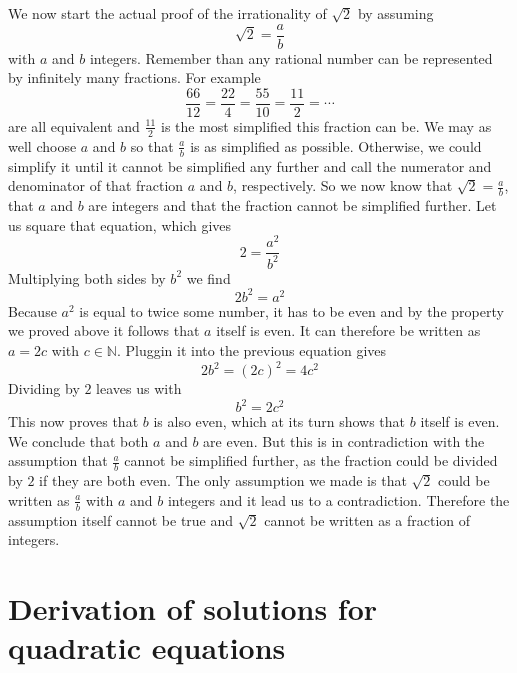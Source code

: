 \noindent We now start the actual proof of the irrationality of $\sqrt{2}$ by assuming
$$
\sqrt{2} = \frac{a}{b}
$$
with $a$ and $b$ integers. Remember than any rational number can be represented by infinitely many fractions. For example
$$
\frac{66}{12} = \frac{22}{4} = \frac{55}{10} = \frac{11}{2} = \cdots
$$
\noindent are all equivalent and $\frac{11}{2}$ is the most simplified this fraction can be. We may as well choose $a$ and $b$ so that $\frac{a}{b}$ is as simplified as possible. Otherwise, we could simplify it until it cannot be simplified any further and call the numerator and denominator of that fraction $a$ and $b$, respectively. So we now know that $\sqrt{2} = \frac{a}{b}$, that $a$ and $b$ are integers and that the fraction cannot be simplified further. Let us square that equation, which gives
$$
2 = \frac{a^2}{b^2}
$$
\noindent Multiplying both sides by $b^2$ we find
$$
2 b^2 = a^2
$$
\noindent Because $a^2$ is equal to twice some number, it has to be even and by the property we proved above it follows that $a$ itself is even. It can therefore be written as $a=2c$ with $c \in \mathbb{N}$. Pluggin it into the previous equation gives
$$
2 b^2 = \left( 2 c \right)^2 = 4 c^2
$$
\noindent Dividing by $2$ leaves us with
$$
b^2 = 2c^2
$$
\noindent This now proves that $b$ is also even, which at its turn shows that $b$ itself is even. We conclude that both $a$ and $b$ are even. But this is in contradiction with the assumption that $\frac{a}{b}$ cannot be simplified further, as the fraction could be divided by $2$ if they are both even. The only assumption we made is that $\sqrt{2}$ could be written as $\frac{a}{b}$ with $a$ and $b$ integers and it lead us to a contradiction. Therefore the assumption itself cannot be true and $\sqrt{2}$ cannot be written as a fraction of integers.

\section{Derivation of solutions for quadratic equations}
\label{DeriveDiscr}

